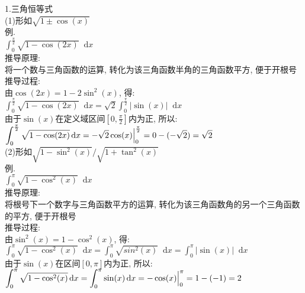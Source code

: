 \documentclass[UTF8, fontset=ubuntu]{ctexart}
\newcommand*{\dif}{\mathop{}\!\mathrm{d}}
\begin{document}
1.三角恒等式\\
(1)形如$\sqrt{1\pm\cos(x)}$\\
例.\\
$\displaystyle\int_0^{\frac{\pi}{2}}\sqrt{1-\cos(2x)}\dif x$\\
推导原理:\\
将一个数与三角函数的运算, 转化为该三角函数半角的三角函数平方, 便于开根号\\
推导过程:\\
由$\cos(2x)=1-2\sin^2(x)$, 得:\\
$\displaystyle\int_0^{\frac{\pi}{2}}\sqrt{1-\cos(2x)}\dif x=\sqrt{2}\int_0^{\frac{\pi}{2}}|\sin(x)|\dif x$\\
由于$\sin(x)$在定义域区间$[0,\frac{\pi}{2}]$内为正, 所以:\\
$\displaystyle\int_0^{\frac{\pi}{2}}\sqrt{1-\cos(2x)}\dif x=-\sqrt{2}\cos(x)\Big{|}_0^{\frac{\pi}{2}}=0-(-\sqrt{2})=\sqrt{2}$\\

(2)形如$\sqrt{1-\sin^2(x)}/\sqrt{1+\tan^2(x)}$\\
例.\\
$\displaystyle\int_0^{\pi}\sqrt{1-\cos^2(x)}\dif x$\\
推导原理:\\
将根号下一个数字与三角函数平方的运算, 转化为该三角函数角的另一个三角函数的平方, 便于开根号\\
推导过程:\\
由$\sin^2(x)=1-\cos^2(x)$, 得:\\
$\displaystyle\int_0^{\pi}\sqrt{1-\cos^2(x)}\dif x=\int_0^{\pi}\sqrt{sin^2(x)}\dif x=\int_0^{\pi}|\sin(x)|\dif x$\\
由于$\sin(x)$在区间$[0,\pi]$内为正, 所以:\\
$\displaystyle\int_0^{\pi}\sqrt{1-\cos^2(x)}\dif x=\int_0^{\pi}\sin(x)\dif x=-\cos(x)\Big{|}_0^{\pi}=1-(-1)=2$\\
\end{document}
